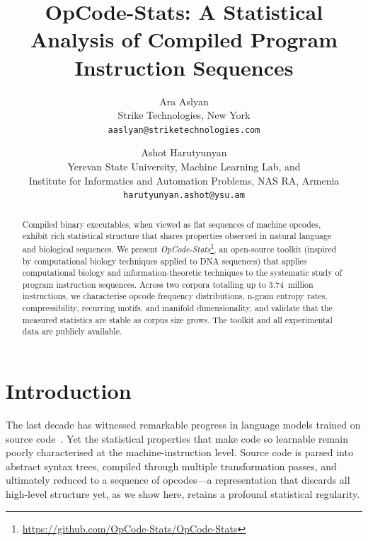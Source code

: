 \documentclass[10pt,twocolumn]{article}
\begin{document}
\title{\textbf{OpCode-Stats: A Statistical Analysis of Compiled Program Instruction Sequences}}

\author{%
  Ara Aslyan\\
  Strike Technologies, New York\\
  \texttt{aaslyan@striketechnologies.com}
  \and
  Ashot Harutyunyan\\
  Yerevan State University, Machine Learning Lab, and\\
  Institute for Informatics and Automation Problems, NAS RA, Armenia\\
  \texttt{harutyunyan.ashot@ysu.am}
}

\date{}

\maketitle

\begin{abstract}
\noindent
Compiled binary executables, when viewed as flat sequences of machine opcodes,
exhibit rich statistical structure that shares properties observed in natural
language and biological sequences.  We present \emph{OpCode-Stats}\footnote{\url{https://github.com/OpCode-Stats/OpCode-Stats}}, an open-source toolkit (inspired by computational biology techniques applied to DNA sequences) that applies
computational biology and information-theoretic techniques to the systematic
study of program instruction sequences.  Across two corpora totalling up to
3.74~million instructions, we characterise opcode frequency distributions,
n-gram entropy rates, compressibility, recurring motifs, and manifold
dimensionality, and validate that the measured statistics are stable as corpus
size grows.  The toolkit and all experimental data are publicly available.
\end{abstract}

\section{Introduction}
\label{sec:intro}

The last decade has witnessed remarkable progress in language models trained on
source code~\cite{chen2021codex,austin2021program}.  Yet the statistical
properties that make code so learnable remain poorly characterised at the
machine-instruction level.  Source code is parsed into abstract syntax trees,
compiled through multiple transformation passes, and ultimately reduced to a
sequence of opcodes---a representation that discards all high-level structure
yet, as we show here, retains a profound statistical regularity.
\end{document}
